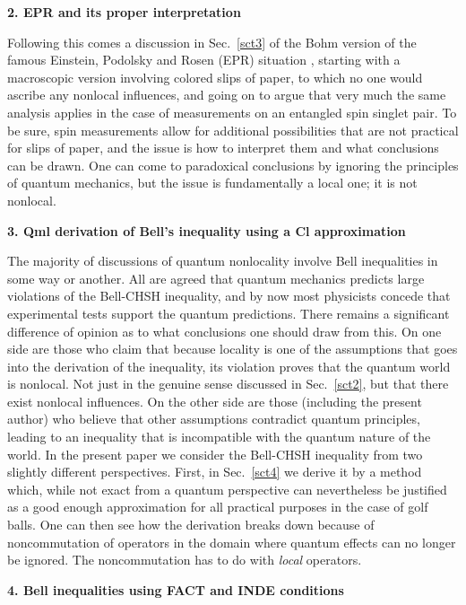 \documentclass[12pt]{article} %
\def\outl#1{\par{\medskip\noindent\hspace*{.5cm}\bf
      \mathversion{bold}#1\mathversion{normal}\smallskip} }
\def\np{} \def\xa{} \def\xb{} \def\xn{} \def\xp{}
\def\outl#1{} \def\np{} \def\xa{} \def\xb{} \def\xn{} \def\xp{}
\def\outl#1{\par{\medskip\noindent\hspace*{.5cm}\bf
      \mathversion{bold}#1\mathversion{normal}\smallskip} }
\def\np{\newpage }\def\xn{\nopagebreak }\def\xp{\pagebreak }
\begin{document}
\xb
\outl{2. EPR and its proper interpretation }
\xa



Following this comes a discussion in Sec.~\ref{sct3} of the Bohm version
\cite{Bhm51s} of the famous Einstein, Podolsky and Rosen (EPR) situation
\cite{EnPR35}, starting with a macroscopic version involving colored slips of
paper, to which no one would ascribe any nonlocal influences, and going on to
argue that very much the same analysis applies in the case of measurements on
an entangled spin singlet pair.  To be sure, spin measurements allow for
additional possibilities that are not practical for slips of paper, and the
issue is how to interpret them and what conclusions can be drawn.  One can
come to paradoxical conclusions by ignoring the principles of quantum
mechanics, but the issue is fundamentally a local one; it is not nonlocal.

\xb
\outl{3. Qml derivation of Bell's inequality using a Cl approximation}
\xa


The majority of discussions of quantum nonlocality involve Bell inequalities 
\cite{CHSH69,Bll81,Bll90b} in some way or another.
%  
All are agreed that quantum mechanics predicts large violations of the
Bell-CHSH inequality, and by now most physicists concede that experimental
tests support the quantum predictions. There remains a significant difference
of opinion as to what conclusions one should draw from this.  On one side are
those who claim that because locality is one of the assumptions that goes into
the derivation of the inequality, its violation proves that the quantum world
is nonlocal. Not just in the genuine sense discussed in Sec.~\ref{sct2}, but
that there exist nonlocal influences.  On the other side are those (including
the present author) who believe that other assumptions contradict quantum
principles, leading to an inequality that is incompatible with the quantum
nature of the world.
%
In the present paper we consider the Bell-CHSH inequality from two slightly
different perspectives.
%
First, in Sec.~\ref{sct4} we derive it by a method
which, while not exact from a quantum perspective can nevertheless be
justified as a good enough approximation for all practical purposes in the
case of golf balls.  One can then see how the derivation breaks down because
of noncommutation of operators in the domain where quantum effects can no
longer be ignored. The noncommutation has to do with \emph{local} operators.

\xb
\outl{4. Bell inequalities using FACT and INDE conditions}
\xa
\end{document}
